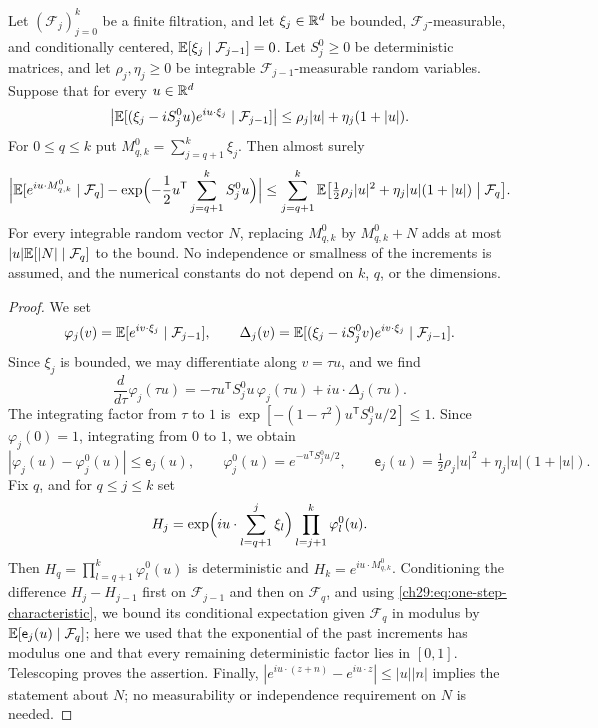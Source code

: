 \begin{lemma}\label{ch29:lem:characteristic-telescope}
Let $(\mathcal F_j)_{j=0}^k$ be a finite filtration, and let $\xi_j\in\mathbb R^d$ be bounded, $\mathcal F_j$-measurable, and conditionally centered, $\mathbb E[\xi_j\mid\mathcal F_{j-1}]=0$. Let $S_j^0\ge0$ be deterministic matrices, and let $\rho_j,\eta_j\ge0$ be integrable $\mathcal F_{j-1}$-measurable random variables. Suppose that for every $u\in\mathbb R^d$
\[
 \bigl|\mathbb E[(\xi_j-iS_j^0u)e^{iu\cdot\xi_j}\mid\mathcal F_{j-1}]\bigr|\le\rho_j|u|+\eta_j(1+|u|).
\]
For $0\le q\le k$ put $M_{q,k}^0=\sum_{j=q+1}^k\xi_j$. Then almost surely
\[
 \Bigl|\mathbb E[e^{iu\cdot M_{q,k}^0}\mid\mathcal F_q]-\exp\Bigl(-\frac12u^{\mathsf T}\sum_{j=q+1}^kS_j^0u\Bigr)\Bigr|\le\sum_{j=q+1}^k\mathbb E\bigl[\tfrac12\rho_j|u|^2+\eta_j|u|(1+|u|)\bigm|\mathcal F_q\bigr].
\]
For every integrable random vector $N$, replacing $M_{q,k}^0$ by $M_{q,k}^0+N$ adds at most $|u|\mathbb E[|N|\mid\mathcal F_q]$ to the bound. No independence or smallness of the increments is assumed, and the numerical constants do not depend on $k$, $q$, or the dimensions.
\end{lemma}

\begin{proof}
We set
\[
 \varphi_j(v)=\mathbb E[e^{iv\cdot\xi_j}\mid\mathcal F_{j-1}],\qquad \Delta_j(v)=\mathbb E[(\xi_j-iS_j^0v)e^{iv\cdot\xi_j}\mid\mathcal F_{j-1}].
\]
Since $\xi_j$ is bounded, we may differentiate along $v=\tau u$, and we find
\[
 \frac d{d\tau}\varphi_j(\tau u)=-\tau u^{\mathsf T}S_j^0u\,\varphi_j(\tau u)+iu\cdot\Delta_j(\tau u).
\]
The integrating factor from $\tau$ to $1$ is $\exp[-(1-\tau^2)u^{\mathsf T}S_j^0u/2]\le1$. Since $\varphi_j(0)=1$, integrating from $0$ to $1$, we obtain
\begin{equation}\label{ch29:eq:one-step-characteristic}
 |\varphi_j(u)-\varphi_j^0(u)|\le\mathsf e_j(u),\qquad \varphi_j^0(u)=e^{-u^{\mathsf T}S_j^0u/2},\qquad \mathsf e_j(u)=\tfrac12\rho_j|u|^2+\eta_j|u|(1+|u|).
\end{equation}
Fix $q$, and for $q\le j\le k$ set
\[
 H_j=\exp\Bigl(iu\cdot\sum_{l=q+1}^j\xi_l\Bigr)\prod_{l=j+1}^k\varphi_l^0(u).
\]
Then $H_q=\prod_{l=q+1}^k\varphi_l^0(u)$ is deterministic and $H_k=e^{iu\cdot M_{q,k}^0}$. Conditioning the difference $H_j-H_{j-1}$ first on $\mathcal F_{j-1}$ and then on $\mathcal F_q$, and using \eqref{ch29:eq:one-step-characteristic}, we bound its conditional expectation given $\mathcal F_q$ in modulus by $\mathbb E[\mathsf e_j(u)\mid\mathcal F_q]$; here we used that the exponential of the past increments has modulus one and that every remaining deterministic factor lies in $[0,1]$. Telescoping proves the assertion. Finally, $|e^{iu\cdot(z+n)}-e^{iu\cdot z}|\le|u||n|$ implies the statement about $N$; no measurability or independence requirement on $N$ is needed.
\end{proof}

